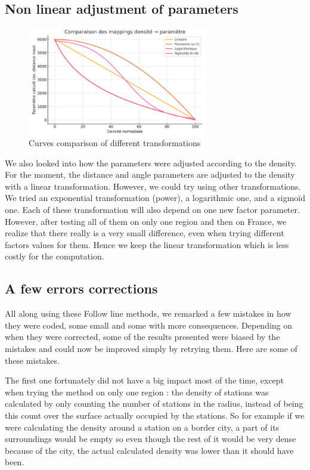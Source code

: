 \documentclass[main.tex]{subfiles}
\begin{document}
\subsection{Non linear adjustment of parameters}

\begin{figure}[H]
    \centering
    \includegraphics[width=0.7\textwidth]{Images/Nonlin_graph.png}
    \caption{Curves comparison of different transformations}
\end{figure}

We also looked into how the parameters were adjusted according to the density. For the moment, the distance and angle parameters are adjusted to the density with a linear transformation. However, we could try using other transformations. We tried an exponential transformation (power), a logarithmic one, and a sigmoïd one. Each of these transformation will also depend on one new factor parameter. However, after testing all of them on only one region and then on France, we realize that there really is a very small difference, even when trying different factors values for them. Hence we keep the linear transformation which is less costly for the computation. 


\subsection{A few errors corrections}

All along using these Follow line methods, we remarked a few mistakes in how they were coded, some small and some with more consequences. Depending on when they were corrected, some of the results presented were biased by the mistakes and could now be improved simply by retrying them. Here are some of these mistakes. 

The first one fortunately did not have a big impact most of the time, except when trying the method on only one region : the density of stations was calculated by only counting the number of stations in the radius, instead of being this count over the surface actually occupied by the stations. So for example if we were calculating the density around a station on a border city, a part of its surroundings would be empty so even though the rest of it would be very dense because of the city, the actual calculated density was lower than it should have been.
\end{document}
